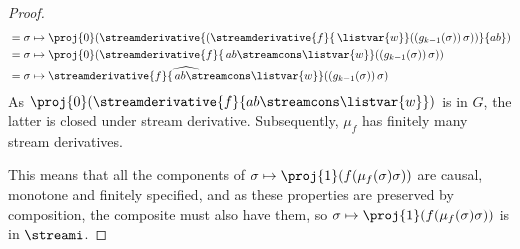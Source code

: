 \begin{proof}
\begin{align*}
         & = \sigma \mapsto \proj{0}\mleft(\streamderivative{\left(\streamderivative{f}{\, \listvar{w}}(\left(g_{k-1}(\sigma)\right)\sigma)\right)}{ab}\mright)    \\
         & = \sigma \mapsto \proj{0}\mleft(\streamderivative{f}{\, ab \streamcons \listvar{w}}(\left(g_{k-1}(\sigma)\right)\sigma)\mright)                         \\
         & = \sigma \mapsto \widehat{\streamderivative{f}{\, ab \streamcons \listvar{w}}}(\left(g_{k-1}(\sigma)\right)\sigma)
    \end{align*}
    As \(\proj{0}\mleft(\streamderivative{f}{ab \streamcons \listvar{w}}\mright)\)
    is in \(G\), the latter  is closed under stream derivative.
    Subsequently, \(\mu_f\) has finitely many stream derivatives.

    This means that all the components of
    \(\sigma \mapsto \proj{1}(f(\mu_f(\sigma)\sigma))\) are causal, monotone and
    finitely specified, and as these properties are preserved by composition,
    the composite must also have them, so
    \(\sigma \mapsto \proj{1}(f(\mu_f(\sigma)\sigma))\) is in \(\streami\).
\end{proof}

